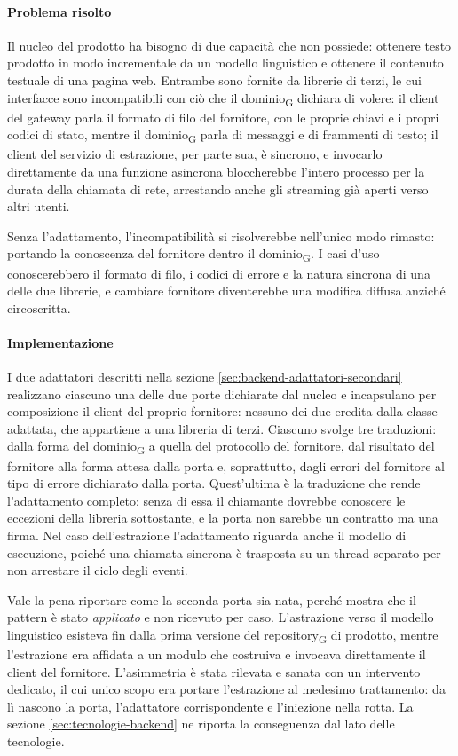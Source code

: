 \documentclass[a4paper, 10pt]{article}
\begin{document}
\paragraph{Problema risolto}
Il nucleo del prodotto ha bisogno di due capacità che non possiede: ottenere testo prodotto in modo incrementale da un modello linguistico e ottenere il contenuto testuale di una pagina web. Entrambe sono fornite da librerie di terzi, le cui interfacce sono incompatibili con ciò che il dominio\textsubscript{G} dichiara di volere: il client del gateway parla il formato di filo del fornitore, con le proprie chiavi e i propri codici di stato, mentre il dominio\textsubscript{G} parla di messaggi e di frammenti di testo; il client del servizio di estrazione, per parte sua, è sincrono, e invocarlo direttamente da una funzione asincrona bloccherebbe l'intero processo per la durata della chiamata di rete, arrestando anche gli streaming già aperti verso altri utenti.

Senza l'adattamento, l'incompatibilità si risolverebbe nell'unico modo rimasto: portando la conoscenza del fornitore dentro il dominio\textsubscript{G}. I casi d'uso conoscerebbero il formato di filo, i codici di errore e la natura sincrona di una delle due librerie, e cambiare fornitore diventerebbe una modifica diffusa anziché circoscritta.

\paragraph{Implementazione}
I due adattatori descritti nella sezione \ref{sec:backend-adattatori-secondari} realizzano ciascuno una delle due porte dichiarate dal nucleo e incapsulano per composizione il client del proprio fornitore: nessuno dei due eredita dalla classe adattata, che appartiene a una libreria di terzi. Ciascuno svolge tre traduzioni: dalla forma del dominio\textsubscript{G} a quella del protocollo del fornitore, dal risultato del fornitore alla forma attesa dalla porta e, soprattutto, dagli errori del fornitore al tipo di errore dichiarato dalla porta. Quest'ultima è la traduzione che rende l'adattamento completo: senza di essa il chiamante dovrebbe conoscere le eccezioni della libreria sottostante, e la porta non sarebbe un contratto ma una firma. Nel caso dell'estrazione l'adattamento riguarda anche il modello di esecuzione, poiché una chiamata sincrona è trasposta su un thread separato per non arrestare il ciclo degli eventi.

Vale la pena riportare come la seconda porta sia nata, perché mostra che il pattern è stato \textit{applicato} e non ricevuto per caso. L'astrazione verso il modello linguistico esisteva fin dalla prima versione del repository\textsubscript{G} di prodotto, mentre l'estrazione era affidata a un modulo che costruiva e invocava direttamente il client del fornitore. L'asimmetria è stata rilevata e sanata con un intervento dedicato, il cui unico scopo era portare l'estrazione al medesimo trattamento: da lì nascono la porta, l'adattatore corrispondente e l'iniezione nella rotta. La sezione \ref{sec:tecnologie-backend} ne riporta la conseguenza dal lato delle tecnologie.
\end{document}
